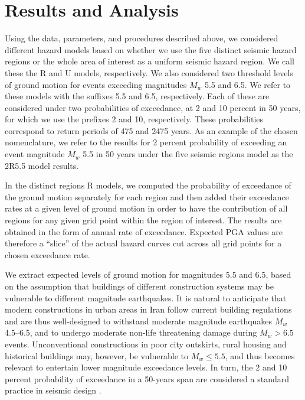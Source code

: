 
\section{Results and Analysis}

Using the data, parameters, and procedures described above, we considered different hazard models based on whether we use the five distinct seismic hazard regions or the whole area of interest as a uniform seismic hazard region. We call these the R and U models, respectively. We also considered two threshold levels of ground motion for events exceeding magnitudes $M_w$ 5.5 and 6.5. We refer to these models with the suffixes 5.5 and 6.5, respectively. Each of these are considered under two probabilities of exceedance, at 2 and 10 percent in 50 years, for which we use the prefixes 2 and 10, respectively. These probabilities correspond to return periods of 475 and 2475 years. As an example of the chosen nomenclature, we refer to the results for 2 percent probability of exceeding an event magnitude $M_w$ 5.5 in 50 years under the five seismic regions model as the 2R5.5 model results.

In the distinct regions R models, we computed the probability of exceedance of the ground motion separately for each region and then added their exceedance rates at a given level of ground motion in order to have the contribution of all regions for any given grid point within the region of interest. The results are obtained in the form of annual rate of exceedance. Expected PGA values are therefore a ``slice'' of the actual hazard curves cut across all grid points for a chosen exceedance rate.

We extract expected levels of ground motion for magnitudes 5.5 and 6.5, based on the assumption that buildings of different construction systems may be vulnerable to different magnitude earthquakes. It is natural to anticipate that modern constructions in urban areas in Iran follow current building regulations and are thus well-designed to withstand moderate magnitude earthquakes $M_w$ 4.5--6.5, and to undergo moderate non-life threatening damage during $M_w > 6.5$ events. Unconventional constructions in poor city outskirts, rural housing and historical buildings may, however, be vulnerable to $M_w \leq 5.5$, and thus becomes relevant to entertain lower magnitude exceedance levels. In turn, the 2 and 10 percent probability of exceedance in a 50-years span are considered a standard practice in seismic design \citep[e.g.,][]{BHRC2014}.


